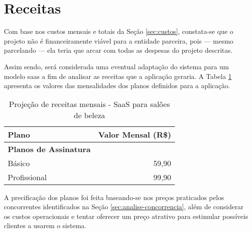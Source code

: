 \section{Receitas}

Com base nos custos mensais e totais da Seção \ref{sec:custos}, constata-se que o projeto não é financeiramente viável para a entidade parceira, pois --- mesmo parcelando --- ela teria que arcar com todas as despesas do projeto descritas.

Assim sendo, será considerada uma eventual adaptação do sistema para um modelo \gls{saas} a fim de analisar as receitas que a aplicação geraria. A Tabela \ref{tab:receitas-saas} apresenta os valores das mensalidades dos planos definidos para a aplicação.

\begin{table}[htbp]
	\centering
	\caption{Projeção de receitas mensais - SaaS para salões de beleza}
	\label{tab:receitas-saas}
	\begin{tabular}{lrr}
		\toprule
		\textbf{Plano} & \multicolumn{2}{r}{\textbf{Valor Mensal (R\$)} }\\
		\midrule
		\multicolumn{1}{l}{\textbf{Planos de Assinatura}} & & \\
		\quad Básico & & 59,90 \\
		\quad Profissional & & 99,90 \\
		\bottomrule
	\end{tabular}
\end{table}

A precificação dos planos foi feita baseando-se nos preços praticados pelos concorrentes identificados na Seção \ref{sec:analise-concorrencia}, além de considerar os custos operacionais e tentar oferecer um preço atrativo para estimular possíveis clientes a usarem o sistema.